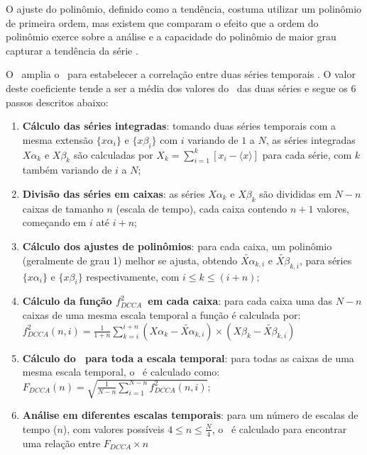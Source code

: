 O ajuste do polinômio, definido como a tendência, costuma utilizar um polinômio de primeira ordem, mas existem que comparam o efeito que a ordem do polinômio exerce sobre a análise e a capacidade do polinômio de maior grau capturar a tendência da série \cite{huEffectTrendsDetrended2001}.  

O \dcca~amplia o \dfa~para estabelecer a correlação entre duas séries temporais \cite{Podobnik2008}. O valor deste coeficiente tende a ser a média dos valores do \dfa~das duas séries e segue os 6 passos descritos abaixo:


  \begin{enumerate}
    \label{steps:DCCA}
  
    \item \textbf{Cálculo das séries integradas}: tomando duas séries temporais com a mesma extensão $\{x\alpha_{i}\}$ e $\{x\beta_{i}\}$ com $i$ variando de $1$ a $N$,
          as séries integradas $X\alpha_{k}$ e $X\beta_{k}$ são calculadas por
          $X_{k} = \sum_{i=1}^{k}\left[x_{i} - \langle x \rangle \right] $ para cada série, com $k$ também variando de $i$ a $N$;
    \item \textbf{Divisão das séries em caixas}: as séries $X\alpha_{k}$ e $X\beta_{k}$ são divididas em $N - n$ caixas de tamanho $n$ (escala de tempo), cada caixa contendo $n + 1$ valores, começando em $i$ até $i + n$;
    \item \textbf{Cálculo dos ajustes de polinômios}: para cada caixa, um polinômio (geralmente de grau 1) melhor se ajusta, obtendo
          $\widetilde{X\alpha}_{k, i}$ e $\widetilde{X\beta}_{k, i}$,
          para séries $\{x\alpha_{i}\}$ e $\{x\beta_{i}\}$ respectivamente,
          com $i \le k \le (i + n)$;
    \item \textbf{Cálculo da função $f_{DCCA}^{2}$~em cada caixa}: para cada caixa uma das $N - n$ caixas de uma mesma escala temporal a função é calculada por:\\[10pt]
     $f_{DCCA}^{2}(n, i) =
            \frac{1}{1+n} \sum_{k=i}^{i + n}(X\alpha_{k}-\widetilde{X\alpha}_{k, i}) \times (X\beta_{k}-\widetilde{X\beta}_{k, i})$
    \item \textbf{Cálculo do \dcca~para toda a escala temporal}: para todas as caixas de uma mesma escala temporal, o \dcca~é calculado como:\\[10pt]
          $F_{DCCA}(n) = \sqrt{\frac{1}{N - n} \sum_{i=1}^{N-n} f_{DCCA}^{2}(n, i)}$;
    \item \textbf{Análise em diferentes escalas temporais}: para um número de escalas de tempo ($n$), com valores possíveis $4 \le n \le \frac{N}{4}$, o \dcca~é calculado para encontrar uma relação entre $F_{DCCA} \times n$

\end{enumerate}

